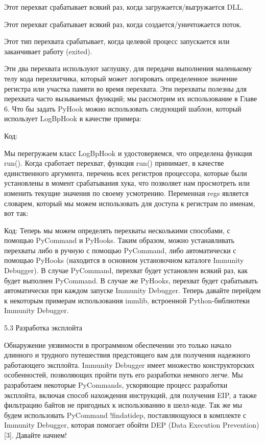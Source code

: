 \documentclass[12pt, a4paper, oneside]{book}
\begin{document}
Этот перехват срабатывает всякий раз, когда загружается/выгружается DLL.

Этот перехват срабатывает всякий раз, когда создается/уничтожается поток.

Этот тип перехвата срабатывает, когда целевой процесс запускается или заканчивает работу (exited). 

Эти два перехвата используют заглушку, для передачи выполнения маленькому телу кода перехватчика, который может логировать определенное значение регистра или участка памяти во время перехвата. Эти перехваты полезны для перехвата часто вызываемых функций; мы рассмотрим их использование в Главе 6.
Что бы задать PyHook можно использовать следующий шаблон, который использует LogBpHook в качестве примера:

Код:



Мы перегружаем класс LogBpHook и удостоверяемся, что определена функция run(). Когда сработает перехват, функция run() принимает, в качестве единственного аргумента, перечень всех регистров процессора, которые были установлены в момент срабатывания хука, что позволяет нам просмотреть или изменить текущие значения по своему усмотрению. Переменная regs является словарем, который мы можем использовать для доступа к регистрам по именам, вот так:

Код:
Теперь мы можем определять перехваты несколькими способами, с помощью PyCommand и PyHooks. Таким образом, можно устанавливать перехваты либо в ручную с помощью PyCommand, либо автоматически с помощью PyHooks (находится в основном установочном каталоге Immunity Debugger). В случае PyCommand, перехват будет установлен всякий раз, как будет выполнен PyCommand. В случае же PyHooks, перехват будет срабатывать автоматически при каждом запуске Immunity Debugger. Теперь давайте перейдем к некоторым примерам использования immlib, встроенной Python-библиотеки Immunity Debugger. 


5.3 Разработка эксплойта

Обнаружение уязвимости в программном обеспечении это только начало длинного и трудного путешествия предстоящего вам для получения надежного работающего эксплойта. Immunity Debugger имеет множество конструкторских особенностей, позволяющих пройти путь его разработки немного легче. Мы разработаем некоторые PyCommands, ускоряющие процесс разработки эксплойта, включая способ нахождения инструкций, для получения EIP, а также фильтрацию байтов не пригодных к использованию в шелл-коде. Так же мы будем использовать PyCommand !findatidep, поставляющуюся в комплекте с Immunity Debugger, которая помогает обойти DEP (Data Execution Prevention) [3]. Давайте начнем! 
\end{document}
